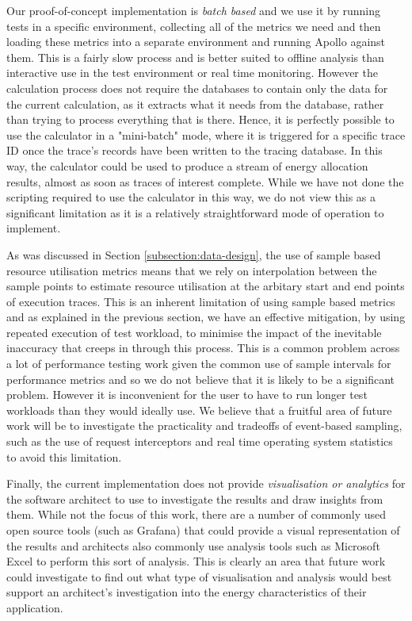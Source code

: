 Our proof-of-concept implementation is \emph{batch based} and we use it by running tests in a specific environment, collecting all of the metrics we need and then loading these metrics into a separate environment and running Apollo against them.  This is a fairly slow process and is better suited to offline analysis than interactive use in the test environment or real time monitoring.  However the calculation process does not require the databases to contain only the data for the current calculation, as it extracts what it needs from the database, rather than trying to process everything that is there.  Hence, it is perfectly possible to use the calculator in a "mini-batch" mode, where it is triggered for a specific trace ID once the trace's records have been written to the tracing database.  In this way, the calculator could be used to produce a stream of energy allocation results, almost as soon as traces of interest complete.  While we have not done the scripting required to use the calculator in this way, we do not view this as a significant limitation as it is a relatively straightforward mode of operation to implement.

As was discussed in Section \ref{subsection:data-design}, the use of sample based resource utilisation metrics means that we rely on interpolation between the sample points to estimate resource utilisation at the arbitary start and end points of execution traces.  This is an inherent limitation of using sample based metrics and as explained in the previous section, we have an effective mitigation, by using repeated execution of test workload, to minimise the impact of the inevitable inaccuracy that creeps in through this process.  This is a common problem across a lot of performance testing work given the common use of sample intervals for performance metrics and so we do not believe that it is likely to be a significant problem. However it is inconvenient for the user to have to run longer test workloads than they would ideally use.  We believe that a fruitful area of future work will be to investigate the practicality and tradeoffs of event-based sampling, such as the use of request interceptors and real time operating system statistics to avoid this limitation.

Finally, the current implementation does not provide \emph{visualisation or analytics} for the software architect to use to investigate the results and draw insights from them.  While not the focus of this work, there are a number of commonly used open source tools (such as Grafana) that could provide a visual representation of the results and architects also commonly use analysis tools such as Microsoft Excel to perform this sort of analysis.  This is clearly an area that future work could investigate to find out what type of visualisation and analysis would best support an architect's investigation into the energy characteristics of their application.


